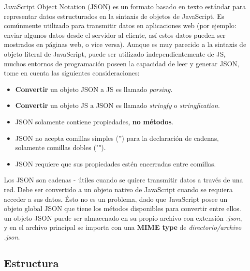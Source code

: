 JavaScript Object Notation (JSON) es un formato basado en texto estándar para representar datos estructurados en la sintaxis de objetos de JavaScript. Es comúnmente utilizado para transmitir datos en aplicaciones web (por ejemplo: enviar algunos datos desde el servidor al cliente, así estos datos pueden ser mostrados en páginas web, o vice versa). Aunque es muy parecido a la sintaxis de objeto literal de JavaScript, puede ser utilizado independientemente de JS, muchos entornos de programación poseen la capacidad de leer y generar JSON, tome en cuenta las siguientes consideraciones:
\begin{itemize}
    \item \textbf{Convertir} un objeto JSON a JS es llamado \textit{parsing}.
    \item \textbf{Convertir} un objeto JS  a JSON es llamado \textit{stringfy} o \textit{stringfication}.
    \item JSON solamente contiene propiedades, \textbf{no métodos}.
    \item JSON no acepta comillas simples ('') para la declaración de cadenas, solamente comillas dobles ("").
    \item JSON requiere que sus propiedades estén encerradas entre comillas.
\end{itemize}

Los JSON son cadenas - útiles cuando se quiere transmitir datos a través de una red. Debe ser convertido a un objeto nativo de JavaScript cuando se requiera acceder a sus datos. Ésto no es un problema, dado que JavaScript posee un objeto global JSON que tiene los métodos disponibles para convertir entre ellos. un objeto JSON puede ser almacenado en su propio archivo con extensión \textit{.json}, y en el archivo principal se importa con una \textbf{MIME type} de \textit{directorio/archivo .json}.


\subsection{Estructura}


